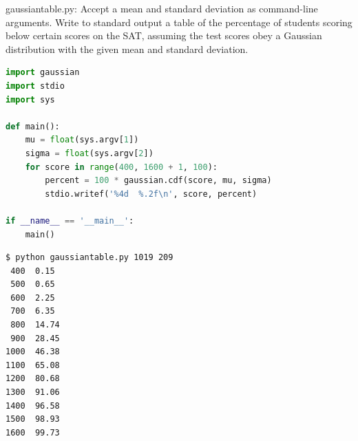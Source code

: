 \documentclass[8pt,a4paper,compress,handout]{beamer}
\begin{document}
\begin{frame}[fragile]
\begin{framed}
\tiny gaussiantable.py:  Accept a mean and standard deviation as command-line arguments. Write to standard output a table of the percentage of students scoring below certain scores on the SAT, assuming the test scores obey a Gaussian  distribution with the given mean and standard deviation.
\end{framed}

\begin{lstlisting}[language=Python]
import gaussian
import stdio
import sys

def main():
    mu = float(sys.argv[1])
    sigma = float(sys.argv[2])
    for score in range(400, 1600 + 1, 100):
        percent = 100 * gaussian.cdf(score, mu, sigma)
        stdio.writef('%4d  %.2f\n', score, percent)
 
if __name__ == '__main__':
    main()
\end{lstlisting}

\begin{lstlisting}[language={}]
$ python gaussiantable.py 1019 209
 400  0.15
 500  0.65
 600  2.25
 700  6.35
 800  14.74
 900  28.45
1000  46.38
1100  65.08
1200  80.68
1300  91.06
1400  96.58
1500  98.93
1600  99.73
\end{lstlisting}
\end{frame}
\end{document}
